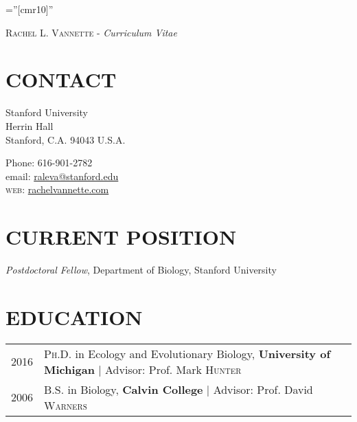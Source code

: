 \documentclass[a4paper,10pt]{article} %
\begin{document}
\pagestyle{empty} %

\font\fb=''[cmr10]'' %

\textsc{\LARGE Rachel L. Vannette} - \textit{\LARGE Curriculum Vitae}\\

\section{\small CONTACT}
\begin{minipage}[t]{0.5\textwidth}
Stanford University\\
Herrin Hall\\
Stanford, C.A. 94043
U.S.A.\\
\end{minipage}
\begin{minipage}[t]{0.5\textwidth}
Phone: 616-901-2782\\
email: \href{mailto:raleva@stanford.edu}{raleva@stanford.edu}\\
\textsc{web}: \href{rachelvannette.com}{rachelvannette.com}
\end{minipage}

\section{\small CURRENT POSITION}
\emph{Postdoctoral Fellow}, Department of Biology, Stanford University


\section{\small EDUCATION}

\begin{tabular}{rl}
\smallskip	
\textsc{2016} & \textsc{Ph.D.} in Ecology and Evolutionary Biology, \textbf{University of Michigan} | \small Advisor: Prof. Mark \textsc{Hunter}\\
\smallskip


\textsc{2006} & \textsc{B.S.} in Biology, \textbf{Calvin College} | \small Advisor: Prof. David \textsc{Warners}\\

\end{tabular}
\end{document}
